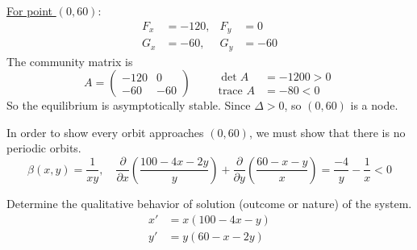 \documentclass[../main-sheet.tex]{subfiles}
\begin{document}
\begin{soln}
    \underline{For point \((0,60)\)}:
    \begin{align*}
        F_x&=-120, &F_y&=0\\
        G_x&=-60, &G_y&=-60
    \end{align*} 
    The community matrix is 
    \[A=\begin{pmatrix}
        -120&0\\
        -60&-60
    \end{pmatrix}\qquad \begin{aligned}
        \det A&=-1200>0\\
        \text{trace } A&=-80<0
    \end{aligned}\]
    So the equilibrium is asymptotically stable. Since \(\Delta>0\), so \((0,60)\) is a node.

    In order to show every orbit approaches \((0,60)\), we must show that there is no periodic orbits.
    \[\beta(x,y)=\frac{1}{xy},\quad \frac{\partial}{\partial x}\left( \frac{100-4x-2y}{y} \right)+\frac{\partial}{\partial y}\left( \frac{60-x-y}{x} \right)=\frac{-4}{y}-\frac{1}{x}<0\]
\end{soln}
\begin{prob}
    Determine the qualitative behavior of solution (outcome or nature) of the system.
    \begin{align*}
        x'&=x(100-4x-y)\\
        y'&=y(60-x-2y)
    \end{align*}
\end{prob}
\end{document}

